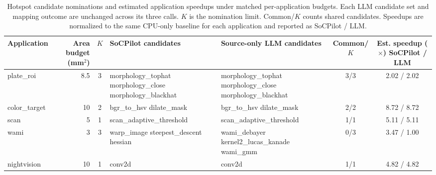 \begin{table}[t]
\centering
\caption{Hotspot candidate nominations and estimated application speedups under matched per-application budgets. Each LLM candidate set and mapping outcome are unchanged across its three calls. $K$ is the nomination limit. Common/$K$ counts shared candidates. Speedups are normalized to the same CPU-only baseline for each application and reported as SoCPilot / LLM.}
\label{tab:hotspot_selection_comparison}
\footnotesize
\renewcommand{\arraystretch}{1.15}
\setlength{\tabcolsep}{3pt}
\begin{tabularx}{0.85\textwidth}{@{}lrc>{\raggedright\arraybackslash}X>{\raggedright\arraybackslash}Xcc@{}}
\toprule
\textbf{Application} & \shortstack{\textbf{Area budget}\\\textbf{(mm$^2$)}} &
\textbf{$K$} & \textbf{SoCPilot candidates} &
\textbf{Source-only LLM candidates} & \textbf{Common/$K$} &
\shortstack{\textbf{Est. speedup ($\times$)}\\\textbf{SoCPilot / LLM}} \\
\midrule
plate\_roi & 8.5 & 3 &
morphology\_tophat\newline
morphology\_close\newline
morphology\_blackhat &
morphology\_tophat\newline
morphology\_close\newline
morphology\_blackhat & 3/3 & 2.02 / 2.02 \\
\midrule
color\_target & 10 & 2 &
bgr\_to\_hsv\newline
dilate\_mask &
bgr\_to\_hsv\newline
dilate\_mask & 2/2 & 8.72 / 8.72 \\
\midrule
scan & 5 & 1 &
scan\_adaptive\_threshold &
scan\_adaptive\_threshold & 1/1 & 5.11 / 5.11 \\
\midrule
wami & 3 & 3 &
warp\_image\newline
steepest\_descent\newline
hessian &
wami\_debayer\newline
kernel2\_lucas\_kanade\newline
wami\_gmm & 0/3 & 3.47 / 1.00 \\
\midrule
nightvision & 10 & 1 &
conv2d &
conv2d & 1/1 & 4.82 / 4.82 \\
\bottomrule
\end{tabularx}
\end{table}